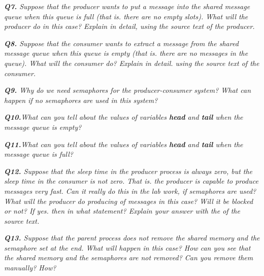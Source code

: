 \documentclass[11pt]{article}
\begin{document}
\vspace{5mm}
\textit{\textbf{Q7.} Suppose that the producer wants to put a message into the shared message queue when this queue is full (that is. there are no empty slots). What will the producer do in this case? Explain in detail, using the source text of the producer.}
\vspace{5mm}


\vspace{5mm}
\textit{\textbf{Q8.} Suppose that the consumer wants to extract a message from the shared message queue when this queue is empty (that is. there are no messages in the queue). What will the consumer do? Explain in detail. using the source text of the consumer.}
\vspace{5mm}


\vspace{5mm}
\textit{\textbf{Q9.}  Why do we need semaphores for the producer-consumer system? What can happen if no semaphores are used in this system? }
\vspace{5mm}


\vspace{5mm}
\textit{\textbf{Q10.}What can you tell about the values of variables \textbf{ head} and \textbf{ tail} when the message queue is empty?}
\vspace{5mm}


\vspace{5mm}
\textit{\textbf{Q11.}What can you tell about the values of variables \textbf{ head} and \textbf{ tail} when the message queue is full?}
\vspace{5mm}


\vspace{5mm}
\textit{\textbf{Q12.} Suppose that the sleep time in the producer process is always zero, but the sleep time in the consumer is not zero. That is. the producer is capable to produce messages very fast. Can it really do this in the lab work, if semaphores are used? What will the producer do producing of messages in this case? Will it be blocked or not? If yes. then in what statement? Explain your answer with the of the source text.}
\vspace{5mm}


\vspace{5mm}
\textit{\textbf{Q13.} Suppose that the parent process does not remove the shared memory and the semaphore set at the end. What will happen in this case? How can you see that the shared memory and the semaphores are not removed? Can you remove them manually? How?}
\vspace{5mm}
\end{document}
